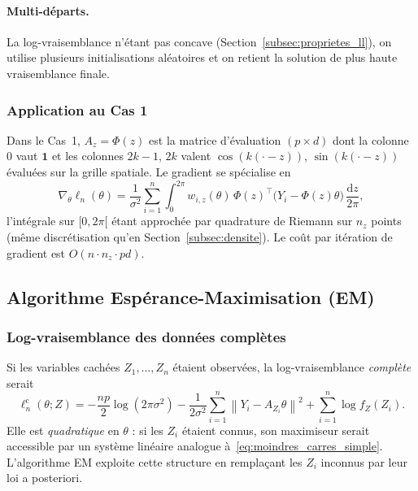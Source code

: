 \documentclass[12pt, a4paper]{article}
\theoremstyle{definition}
\newcommand{\norm}[1]{\left\|#1\right\|}
\begin{document}
\paragraph{Multi-départs.}
La log-vraisemblance n'étant pas concave (Section~\ref{subsec:proprietes_ll}), on utilise plusieurs initialisations aléatoires et on retient la solution de plus haute vraisemblance finale.

\subsubsection{Application au Cas 1}

Dans le Cas~1, $A_z = \Phi(z)$ est la matrice d'évaluation $(p \times d)$ dont la colonne~$0$ vaut $\mathbf{1}$ et les colonnes $2k-1$, $2k$ valent $\cos(k(\cdot - z))$, $\sin(k(\cdot - z))$ évaluées sur la grille spatiale. Le gradient se spécialise en
\[
    \nabla_\theta \ell_n(\theta)
    = \frac{1}{\sigma^2}
      \sum_{i=1}^{n} \int_0^{2\pi} w_{i,z}(\theta)\,
      \Phi(z)^\top\bigl(Y_i - \Phi(z)\theta\bigr)\,\frac{\mathrm{d}z}{2\pi},
\]
l'intégrale sur $[0,2\pi[$ étant approchée par quadrature de Riemann sur $n_z$ points (même discrétisation qu'en Section~\ref{subsec:densite}). Le coût par itération de gradient est $O(n \cdot n_z \cdot pd)$.

\subsection{Algorithme Espérance-Maximisation (EM)}
\label{subsec:em}

\subsubsection{Log-vraisemblance des données complètes}

Si les variables cachées $Z_1, \ldots, Z_n$ étaient observées, la log-vraisemblance \emph{complète} serait
\begin{equation}
    \ell_n^{\mathrm{c}}(\theta; Z)
    = -\frac{np}{2}\log(2\pi\sigma^2)
      - \frac{1}{2\sigma^2}\sum_{i=1}^{n}\norm{Y_i - A_{Z_i}\theta}^2
      + \sum_{i=1}^{n}\log f_Z(Z_i).
    \label{eq:ll_complete}
\end{equation}
Elle est \emph{quadratique} en $\theta$ : si les $Z_i$ étaient connus, son maximiseur serait accessible par un système linéaire analogue à~\eqref{eq:moindres_carres_simple}. L'algorithme EM exploite cette structure en remplaçant les $Z_i$ inconnus par leur loi a posteriori.
\end{document}
